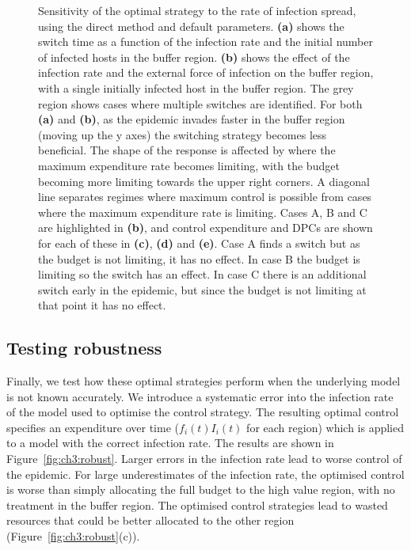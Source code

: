 \begin{figure}
    \begin{center}
        \caption[Switch time sensitivity to spread rate]{Sensitivity of the optimal strategy to the rate of infection spread, using the direct method and default parameters. \textbf{(a)} shows the switch time as a function of the infection rate and the initial number of infected hosts in the buffer region. \textbf{(b)} shows the effect of the infection rate and the external force of infection on the buffer region, with a single initially infected host in the buffer region. The grey region shows cases where multiple switches are identified. For both \textbf{(a)} and \textbf{(b)}, as the epidemic invades faster in the buffer region (moving up the y axes) the switching strategy becomes less beneficial. The shape of the response is affected by where the maximum expenditure rate becomes limiting, with the budget becoming more limiting towards the upper right corners. A diagonal line separates regimes where maximum control is possible from cases where the maximum expenditure rate is limiting. Cases A, B and C are highlighted in \textbf{(b)}, and control expenditure and DPCs are shown for each of these in \textbf{(c)}, \textbf{(d)} and \textbf{(e)}. Case A finds a switch but as the budget is not limiting, it has no effect. In case B the budget is limiting so the switch has an effect. In case C there is an additional switch early in the epidemic, but since the budget is not limiting at that point it has no effect.\label{fig:ch3:sens_1}}
    \end{center}
\end{figure}

\subsection{Testing robustness}

Finally, we test how these optimal strategies perform when the underlying model is not known accurately. We introduce a systematic error into the infection rate of the model used to optimise the control strategy. The resulting optimal control specifies an expenditure over time ($f_i(t)I_i(t)$ for each region) which is applied to a model with the correct infection rate. The results are shown in Figure~\ref{fig:ch3:robust}. Larger errors in the infection rate lead to worse control of the epidemic. For large underestimates of the infection rate, the optimised control is worse than simply allocating the full budget to the high value region, with no treatment in the buffer region. The optimised control strategies lead to wasted resources that could be better allocated to the other region (Figure~\ref{fig:ch3:robust}(c)).

